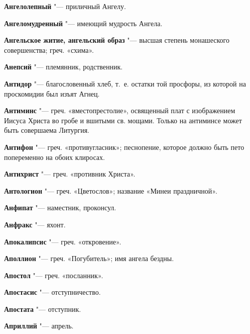 \begin{mymulticols}{2}
\noindent\textbf{Ангелолепный} "--- приличный Ангелу. 




\noindent\textbf{Ангеломудренный} "--- имеющий мудрость Ангела. 




\noindent\textbf{Ангельское житие, ангельский образ} "--- высшая степень монашеского совершенства; греч. «схима». 




\noindent\textbf{Анепсий} "--- племянник, родственник. 




\noindent\textbf{Антидор} "--- благословенный хлеб, т.~е. остатки той просфоры, из которой на проскомидии был изъят Агнец. 




\noindent\textbf{Антиминс} "--- греч. «вместопрестолие», освященный плат с изображением Иисуса Христа во гробе и вшитыми св. мощами. Только на антиминсе может быть совершаема Литургия. 




\noindent\textbf{Антифон} "--- греч. «противугласник»; песнопение, которое должно быть пето попеременно на обоих клиросах. 




\noindent\textbf{Антихрист} "--- греч. «противник Христа». 




\noindent\textbf{Антологион} "--- греч. «Цветослов»; название «Минеи праздничной». 




\noindent\textbf{Анфипат} "--- наместник, проконсул. 




\noindent\textbf{Анфракс} "--- яхонт. 




\noindent\textbf{Апокалипсис} "--- греч. «откровение». 




\noindent\textbf{Аполлион} "--- греч. «Погубитель»; имя ангела бездны. 




\noindent\textbf{Апостол} "--- греч. «посланник». 




\noindent\textbf{Апостасис} "--- отступничество. 




\noindent\textbf{Апостата} "--- отступник. 




\noindent\textbf{Априллий} "--- апрель. 





\end{mymulticols}
